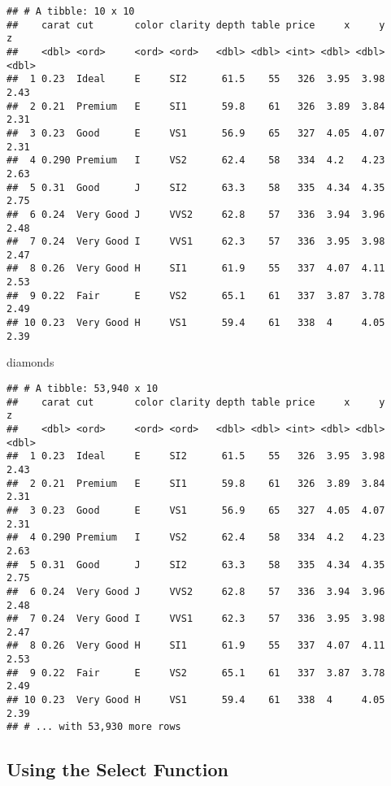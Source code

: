 \documentclass[]{article}
\newenvironment{Shaded}{\begin{snugshade}}{\end{snugshade}}
\newcommand{\NormalTok}[1]{#1}
\begin{document}
\begin{verbatim}
## # A tibble: 10 x 10
##    carat cut       color clarity depth table price     x     y     z
##    <dbl> <ord>     <ord> <ord>   <dbl> <dbl> <int> <dbl> <dbl> <dbl>
##  1 0.23  Ideal     E     SI2      61.5    55   326  3.95  3.98  2.43
##  2 0.21  Premium   E     SI1      59.8    61   326  3.89  3.84  2.31
##  3 0.23  Good      E     VS1      56.9    65   327  4.05  4.07  2.31
##  4 0.290 Premium   I     VS2      62.4    58   334  4.2   4.23  2.63
##  5 0.31  Good      J     SI2      63.3    58   335  4.34  4.35  2.75
##  6 0.24  Very Good J     VVS2     62.8    57   336  3.94  3.96  2.48
##  7 0.24  Very Good I     VVS1     62.3    57   336  3.95  3.98  2.47
##  8 0.26  Very Good H     SI1      61.9    55   337  4.07  4.11  2.53
##  9 0.22  Fair      E     VS2      65.1    61   337  3.87  3.78  2.49
## 10 0.23  Very Good H     VS1      59.4    61   338  4     4.05  2.39
\end{verbatim}

\begin{Shaded}
\begin{Highlighting}[]
\NormalTok{diamonds}
\end{Highlighting}
\end{Shaded}

\begin{verbatim}
## # A tibble: 53,940 x 10
##    carat cut       color clarity depth table price     x     y     z
##    <dbl> <ord>     <ord> <ord>   <dbl> <dbl> <int> <dbl> <dbl> <dbl>
##  1 0.23  Ideal     E     SI2      61.5    55   326  3.95  3.98  2.43
##  2 0.21  Premium   E     SI1      59.8    61   326  3.89  3.84  2.31
##  3 0.23  Good      E     VS1      56.9    65   327  4.05  4.07  2.31
##  4 0.290 Premium   I     VS2      62.4    58   334  4.2   4.23  2.63
##  5 0.31  Good      J     SI2      63.3    58   335  4.34  4.35  2.75
##  6 0.24  Very Good J     VVS2     62.8    57   336  3.94  3.96  2.48
##  7 0.24  Very Good I     VVS1     62.3    57   336  3.95  3.98  2.47
##  8 0.26  Very Good H     SI1      61.9    55   337  4.07  4.11  2.53
##  9 0.22  Fair      E     VS2      65.1    61   337  3.87  3.78  2.49
## 10 0.23  Very Good H     VS1      59.4    61   338  4     4.05  2.39
## # ... with 53,930 more rows
\end{verbatim}

\subsection{Using the Select Function}\label{using-the-select-function}
\end{document}

